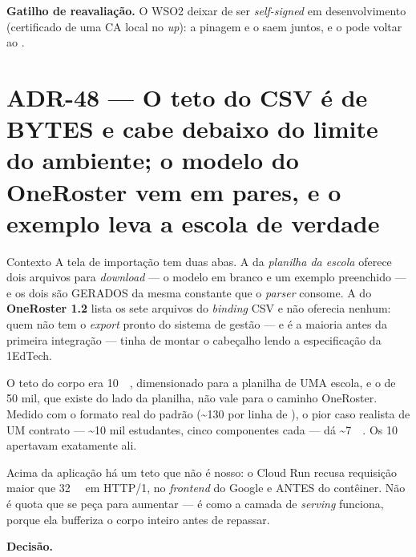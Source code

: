 \textbf{Gatilho de reavaliação.} O WSO2 deixar de ser \emph{self-signed} em
desenvolvimento (certificado de uma CA local no \emph{up}): a pinagem e o
 saem juntos, e o  pode voltar ao
.

\section{ADR-48 --- O teto do CSV é de BYTES e cabe debaixo do limite do
ambiente; o modelo do OneRoster vem em pares, e o exemplo leva a escola de
verdade}
\label{adr:modelos-oneroster}

\begin{especificacao}{Contexto}
A tela de importação tem duas abas. A da \emph{planilha da escola} oferece dois
arquivos para \emph{download} --- o modelo em branco e um exemplo preenchido ---
e os dois são GERADOS da mesma constante que o \emph{parser} consome. A do
\textbf{OneRoster 1.2} lista os sete arquivos do \emph{binding} CSV e não
oferecia nenhum: quem não tem o \emph{export} pronto do sistema de gestão --- e
é a maioria antes da primeira integração --- tinha de montar o cabeçalho lendo a
especificação da 1EdTech.

O teto do corpo era \SI{10}{\mega\byte}, dimensionado para a planilha de UMA
escola, e o  de 50 mil, que existe do lado da planilha, não vale
para o caminho OneRoster. Medido com o formato real do padrão
(\textasciitilde\SI{130}{\byte} por linha de ), o pior
caso realista de UM contrato --- \textasciitilde10 mil estudantes, cinco
componentes cada --- dá \textasciitilde\SI{7}{\mega\byte}. Os
\SI{10}{\mega\byte} apertavam exatamente ali.

Acima da aplicação há um teto que não é nosso: o Cloud Run recusa requisição
maior que \SI{32}{\mebi\byte} em HTTP/1, no \emph{frontend} do Google e
ANTES do contêiner. Não é quota que se peça para aumentar --- é como a camada de
\emph{serving} funciona, porque ela bufferiza o corpo inteiro antes de
repassar.
\end{especificacao}

\textbf{Decisão.}

